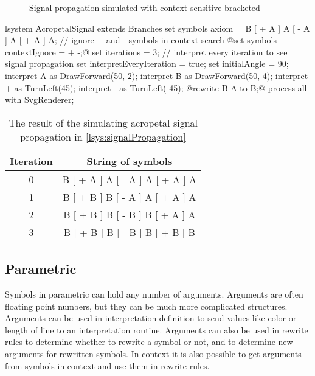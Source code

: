 \begin{figure}[h!]
	\centering
	\hspace{2mm}
	\caption{Signal propagation simulated with context-sensitive bracketed \lsystems}
	\label{fig:signalPropagation}
\end{figure}

\begin{Lsystem}[label=lsys:signalPropagation,caption={The \lsystem simulating acropetal signal propagation (\autoref{fig:acropetalSignal})}]
lsystem AcropetalSignal extends Branches {
	set symbols axiom = B [ + A ] A [ - A ] A [ + A ] A;
	// ignore + and - symbols in context search
	@set symbols contextIgnore = + -;@
	set iterations = 3;
	// interpret every iteration to see signal propagation
	set interpretEveryIteration = true;
	set initialAngle = 90;
	interpret A as DrawForward(50, 2);
	interpret B as DrawForward(50, 4);
	interpret + as TurnLeft(45);
	interpret - as TurnLeft(-45);
	@rewrite { B } A to B;@
}
process all with SvgRenderer;
\end{Lsystem}


\begin{table}[h]
	\centering
	\begin{tabular}{c c}
   		\toprule
   		Iteration & String of symbols \\
   		\midrule
		0 & B [ + A ] A [ - A ] A [ + A ] A \\
		1 & B [ + B ] B [ - A ] A [ + A ] A \\
		2 & B [ + B ] B [ - B ] B [ + A ] A \\
		3 & B [ + B ] B [ - B ] B [ + B ] B \\
		\bottomrule
	\end{tabular}
	\caption{The result of the \lsystem simulating acropetal signal propagation in \autoref{lsys:signalPropagation}}
	\label{fig:signalPropagationTable}
\end{table}


\subsection{Parametric \lsystems}

Symbols in parametric \lsystems can hold any number of arguments.
Arguments are often floating point numbers, but they can be much more complicated structures.
Arguments can be used in interpretation definition to send values like color or length of line to an interpretation routine.
Arguments can also be used in rewrite rules to determine whether to rewrite a symbol or not, and to determine new arguments for rewritten symbols.
In context \twolsystems it is also possible to get arguments from symbols in context and use them in rewrite rules.

